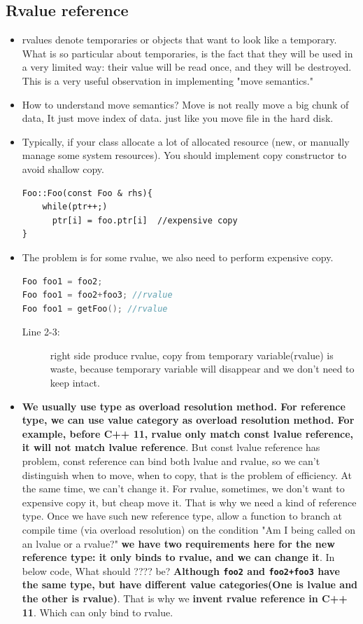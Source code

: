 \documentclass[a4paper,11pt,twoside]{book}
\begin{document}
\subsection{Rvalue reference}
\begin{itemize}
	
	\item rvalues denote temporaries or objects that want to look like a temporary. What is so particular about temporaries, is the fact that they will be used in a very limited way: their value will be read once, and they will be destroyed. This is a very useful observation in implementing "move semantics." 
	
	\item How to understand move semantics? Move is not really move a big chunk of data, It just move index of data. just like you move file in the hard disk. 
	
	
	\item Typically, if your class allocate a lot of allocated resource (new, or manually manage some system resources).  You should implement copy constructor to avoid shallow copy. 
\begin{lstlisting}[numbers=none]
Foo::Foo(const Foo & rhs){
	while(ptr++;)
	  ptr[i] = foo.ptr[i]  //expensive copy
}
\end{lstlisting}

	\item The problem is for some rvalue, we also need to perform expensive copy. 
\begin{lstlisting}[frame=single, language=c++]
Foo foo1 = foo2;
Foo foo1 = foo2+foo3; //rvalue
Foo foo1 = getFoo(); //rvalue
\end{lstlisting}

\begin{description}
	\item[Line 2-3:] right side produce rvalue, copy from temporary variable(rvalue) is waste, because temporary variable will disappear and we don't need to keep intact. 
\end{description}

	\item \textbf{We usually use type as overload resolution method. For reference type, we can use value category as overload resolution method. For example, before C++ 11, rvalue only match const lvalue reference, it will not match lvalue reference}. But const lvalue reference has problem, const reference can bind both lvalue and rvalue, so we can't distinguish when to move, when to copy, that is the problem of efficiency. At the same time, we can't change it. For rvalue, sometimes, we don't want to expensive copy it, but cheap move it. That is why we need a kind of reference type. Once we have such new reference type,  allow a function to branch at compile time (via overload resolution) on the condition "Am I being called on an lvalue or a rvalue?" \textbf{ we have two requirements here for the new reference type: it only binds to rvalue, and we can change it}. In below code, What should ???? be? \textbf{Although \texttt{foo2} and \texttt{foo2+foo3} have the same type, but have different value categories(One is lvalue and the other is rvalue)}. That is why we \textbf{invent rvalue reference in C++ 11}. Which can only bind to rvalue. 


\end{itemize}
\end{document}
